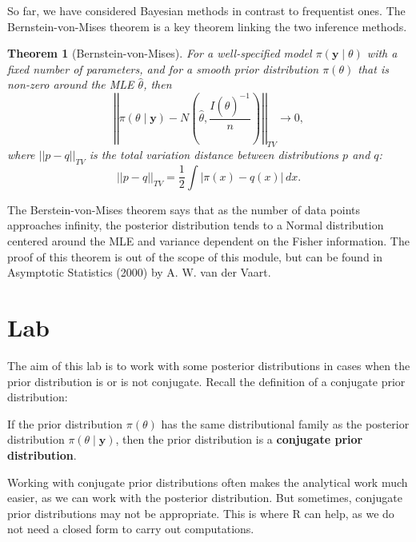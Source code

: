 \documentclass[
]{book}
\newtheorem{theorem}{Theorem}[chapter]
\theoremstyle{definition}
\theoremstyle{definition}
\theoremstyle{definition}
\theoremstyle{definition}
\theoremstyle{remark}
\begin{document}
So far, we have considered Bayesian methods in contrast to frequentist ones. The Bernstein-von-Mises theorem is a key theorem linking the two inference methods.

\begin{theorem}[Bernstein-von-Mises]
For a well-specified model \(\pi(\boldsymbol{y} \mid \theta)\) with a fixed number of parameters, and for a smooth prior distribution \(\pi(\theta)\) that is non-zero around the MLE \(\hat{\theta}\), then
\[
\left|\left| \pi(\theta \mid \boldsymbol{y}) - N\left(\hat{\theta}, \frac{I(\hat{\theta})^{-1}}{n}\right) \right|\right|_{TV} \rightarrow 0,
\]
where \(||p - q||_{TV}\) is the total variation distance between distributions \(p\) and \(q\):
\[
||p - q||_{TV} = \frac{1}{2}\int|\pi(x) - q(x)|\,dx.
\]
\end{theorem}

The Berstein-von-Mises theorem says that as the number of data points approaches infinity, the posterior distribution tends to a Normal distribution centered around the MLE and variance dependent on the Fisher information. The proof of this theorem is out of the scope of this module, but can be found in Asymptotic Statistics (2000) by A. W. van der Vaart.

\hypertarget{lab}{%
\section{Lab}\label{lab}}

The aim of this lab is to work with some posterior distributions in cases when the prior distribution is or is not conjugate. Recall the definition of a conjugate prior distribution:

If the prior distribution \(\pi(\theta)\) has the same distributional family as the posterior distribution \(\pi(\theta \mid \boldsymbol{y})\), then the prior distribution is a \textbf{conjugate prior distribution}.

Working with conjugate prior distributions often makes the analytical work much easier, as we can work with the posterior distribution. But sometimes, conjugate prior distributions may not be appropriate. This is where R can help, as we do not need a closed form to carry out computations.
\end{document}
